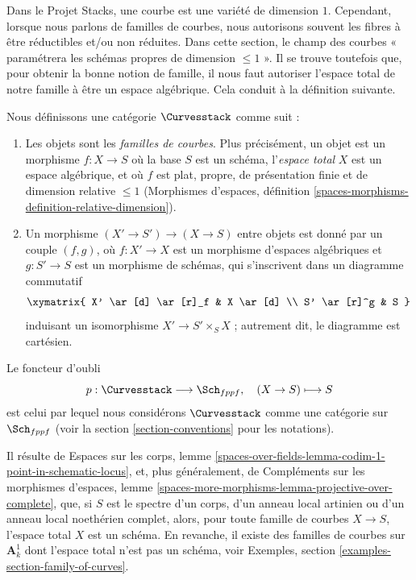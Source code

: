 \medskip\noindent
Dans le Projet Stacks, une courbe est une variété de dimension $1$.
Cependant, lorsque nous parlons de familles de courbes, nous autorisons souvent
les fibres à être réductibles et/ou non réduites. Dans cette section, le champ
des courbes « paramétrera les schémas propres de dimension $\leq 1$ ».
Il se trouve toutefois que, pour obtenir la bonne notion de famille, il nous
faut autoriser l'espace total de notre famille à être un espace algébrique.
Cela conduit à la définition suivante.

\begin{situation}
\label{situation-curves}
Nous définissons une catégorie $\Curvesstack$ comme suit :
\begin{enumerate}
\item Les objets sont les {\it familles de courbes}. Plus précisément, un
objet est un morphisme $f : X \to S$ où la base $S$ est un schéma,
l'{\it espace total} $X$ est un espace algébrique, et où
$f$ est plat, propre, de présentation finie et de dimension relative
$\leq 1$ (Morphismes d'espaces, définition
\ref{spaces-morphisms-definition-relative-dimension}).
\item Un morphisme $(X' \to S') \to (X \to S)$ entre objets est donné par un
couple $(f, g)$, où $f : X' \to X$ est un morphisme d'espaces algébriques et
$g : S' \to S$ est un morphisme de schémas, qui s'inscrivent dans un diagramme
commutatif
$$
\xymatrix{
X' \ar[d] \ar[r]_f & X \ar[d] \\
S' \ar[r]^g & S
}
$$
induisant un isomorphisme $X' \to S' \times_S X$ ; autrement dit, le
diagramme est cartésien.
\end{enumerate}
Le foncteur d'oubli
$$
p : \Curvesstack \longrightarrow \Sch_{fppf},\quad
(X \to S) \longmapsto S
$$
est celui par lequel nous considérons $\Curvesstack$ comme une catégorie sur
$\Sch_{fppf}$
(voir la section \ref{section-conventions} pour les notations).
\end{situation}

\noindent
Il résulte de Espaces sur les corps, lemme
\ref{spaces-over-fields-lemma-codim-1-point-in-schematic-locus},
et, plus généralement, de
Compléments sur les morphismes d'espaces, lemme
\ref{spaces-more-morphisms-lemma-projective-over-complete},
que, si $S$ est le spectre d'un corps, d'un anneau local artinien ou d'un
anneau local noethérien complet, alors, pour toute famille de courbes
$X \to S$, l'espace total $X$ est un schéma.
En revanche, il existe des familles de courbes sur $\mathbf{A}^1_k$ dont
l'espace total n'est pas un schéma, voir
Exemples, section \ref{examples-section-family-of-curves}.

